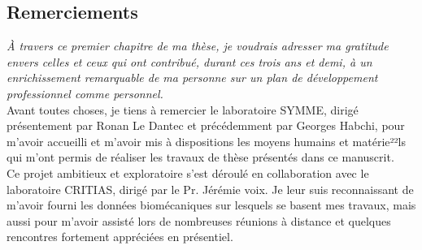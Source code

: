 
{}

\vspace*{-1.6cm}
\begin{flushright}
\section*{\fontsize{20pt}{20pt}\lettrine[lines=1]{Remerciements}{}}
\end{flushright}
\vspace{0.5cm}


\chead[\fancyplain{}{}]
      {\fancyplain{}{}}
\lfoot[\fancyplain{}{}]
      {\fancyplain{}{}}
\cfoot[\fancyplain{}{\thepage}]
      {\fancyplain{}{\thepage}}
\rfoot[\fancyplain{}{}]%
     {\fancyplain{}{\scriptsize}}


\emph{À travers ce premier chapitre de ma thèse, je voudrais adresser ma gratitude envers celles et ceux qui ont contribué, durant ces trois ans et demi, à un enrichissement remarquable de ma personne sur un plan de développement professionnel comme personnel.}\\

Avant toutes choses, je tiens à remercier le laboratoire SYMME, dirigé présentement par Ronan Le Dantec et précédemment par Georges Habchi, pour m'avoir accueilli et m'avoir mis à dispositions les moyens humains et matérie²²ls qui m'ont permis de réaliser les travaux de thèse présentés dans ce manuscrit. \\

Ce projet ambitieux et exploratoire s'est déroulé en collaboration avec le laboratoire CRITIAS, dirigé par le Pr. Jérémie voix. Je leur suis reconnaissant de m'avoir fourni les données biomécaniques sur lesquels se basent mes travaux, mais aussi pour m'avoir assisté lors de nombreuses réunions à distance et quelques rencontres fortement appréciées en présentiel. \\

